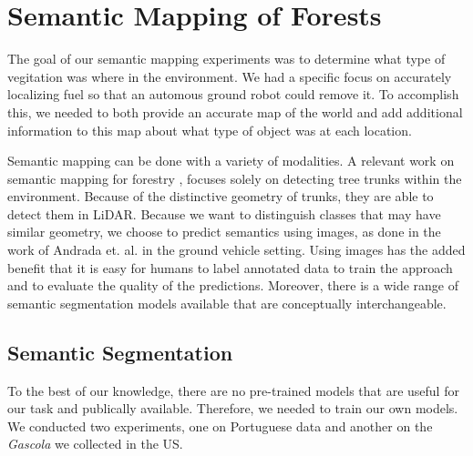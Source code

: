 \section{Semantic Mapping of Forests}
The goal of our semantic mapping experiments was to determine what type of vegitation was where in the environment. We had a specific focus on accurately localizing fuel so that an automous ground robot could remove it. To accomplish this, we needed to both provide an accurate map of the world and add additional information to this map about what type of object was at each location.

Semantic mapping can be done with a variety of modalities. A relevant work on semantic mapping for forestry \cite{Chen2020SLOAM:Inventory}, focuses solely on detecting tree trunks within the environment. Because of the distinctive geometry of trunks, they are able to detect them in LiDAR. Because we want to distinguish classes that may have similar geometry, we choose to predict semantics using images, as done in the work of Andrada et. al. \cite{Andrada2020} in the ground vehicle setting. Using images has the added benefit that it is easy for humans to label annotated data to train the approach and to evaluate the quality of the predictions. Moreover, there is a wide range of semantic segmentation models available that are conceptually interchangeable. 

\subsection{Semantic Segmentation}
To the best of our knowledge, there are no pre-trained models that are useful for our task and publically available. Therefore, we needed to train our own models. We conducted two experiments, one on Portuguese data and another on the \textit{Gascola} we collected in the US. 

